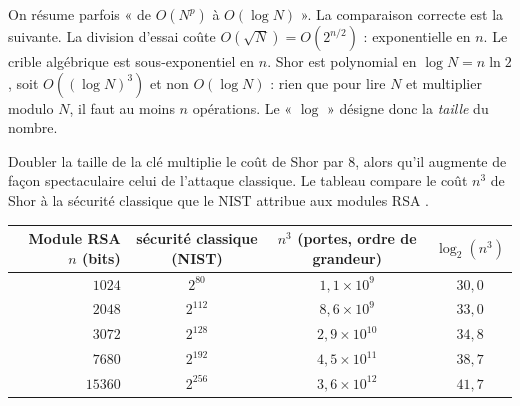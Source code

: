 \begin{remarque}
On résume parfois « de $O(N^p)$ à $O(\log N)$ ». La comparaison correcte est la suivante. La division
d'essai coûte $O(\sqrt N)=O(2^{n/2})$ : exponentielle en $n$. Le crible algébrique est sous-exponentiel en $n$. Shor est
polynomial en $\log N=n\ln2$, soit $O((\log N)^3)$ et non $O(\log N)$ : rien que pour lire $N$ et multiplier
modulo $N$, il faut au moins $n$ opérations. Le « $\log$ » désigne donc la \emph{taille} du nombre.
\end{remarque}

Doubler la taille de la clé multiplie le coût de Shor par $8$, alors qu'il augmente de façon
spectaculaire celui de l'attaque classique. Le tableau compare le coût $n^3$ de Shor à la sécurité
classique que le NIST attribue aux modules RSA \parencite{nist80057}.

\begin{center}
\renewcommand{\arraystretch}{1.2}
\begin{tabular}{@{}rccc@{}}
\toprule
Module RSA $n$ (bits) & sécurité classique (NIST) & $n^3$ (portes, ordre de grandeur) & $\log_2(n^3)$\\
\midrule
$1024$ & $2^{80}$ & $1{,}1\times10^{9}$ & $30{,}0$\\
$2048$ & $2^{112}$ & $8{,}6\times10^{9}$ & $33{,}0$\\
$3072$ & $2^{128}$ & $2{,}9\times10^{10}$ & $34{,}8$\\
$7680$ & $2^{192}$ & $4{,}5\times10^{11}$ & $38{,}7$\\
$15360$ & $2^{256}$ & $3{,}6\times10^{12}$ & $41{,}7$\\
\bottomrule
\end{tabular}
\end{center}


